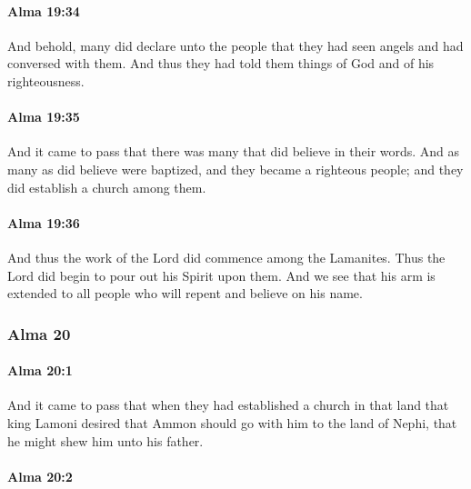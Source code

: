 		\paragraph{Alma 19:34} %
			\label{ALMA-19-34}

			And behold, many did declare unto the people
			that they had seen angels and had conversed with them.
			And thus they had told them things of God and of his righteousness.

		\paragraph{Alma 19:35} %
			\label{ALMA-19-35}

			And it came to pass that there was many that did believe in their words.
			And as many as did believe were baptized,
			and they became a righteous people;
			and they did establish a church among them.

		\paragraph{Alma 19:36} %
			\label{ALMA-19-36}

			And thus the work of the Lord did commence among the Lamanites.
			Thus the Lord did begin to pour out his Spirit upon them.
			And we see that his arm is extended to all people
			who will repent and believe on his name.

	\subsubsection{Alma 20} %
		\label{ALMA-20}
		
		\paragraph{Alma 20:1} %
			\label{ALMA-20-1}

			And it came to pass that when they had established a church in that land
			that king Lamoni desired that Ammon should go with him to the land of Nephi,
			that he might shew him unto his father.

		\paragraph{Alma 20:2} %
			\label{ALMA-20-2}

